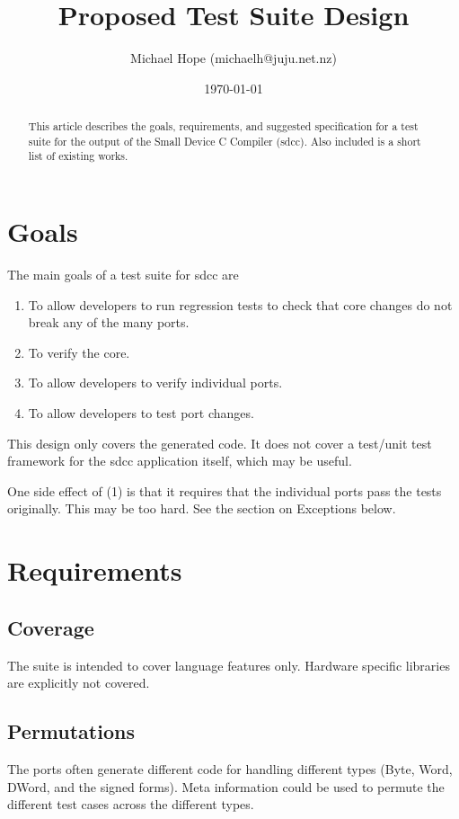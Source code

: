 \documentclass{widearticle}
\begin{document}
\title{Proposed Test Suite Design}
\author{Michael Hope (michaelh@juju.net.nz)}
\date{\today}
\maketitle

\begin{abstract}
This article describes the goals, requirements, and suggested
specification for a test suite for the output of the Small Device C
Compiler (sdcc).  Also included is a short list of existing works.
\end{abstract}

\section{Goals}
The main goals of a test suite for sdcc are
\begin{enumerate}
    \item To allow developers to run regression tests to check that
core changes do not break any of the many ports.
    \item To verify the core.
    \item To allow developers to verify individual ports.
    \item To allow developers to test port changes.
\end{enumerate}

This design only covers the generated code.  It does not cover a
test/unit test framework for the sdcc application itself, which may be
useful.

One side effect of (1) is that it requires that the individual ports
pass the tests originally.  This may be too hard.  See the section on
Exceptions below.

\section{Requirements}
\subsection{Coverage}
The suite is intended to cover language features only.  Hardware
specific libraries are explicitly not covered.

\subsection{Permutations}
The ports often generate different code for handling different types
(Byte, Word, DWord, and the signed forms).  Meta information
could be used to permute the different test cases across the different
types.
\end{document}
